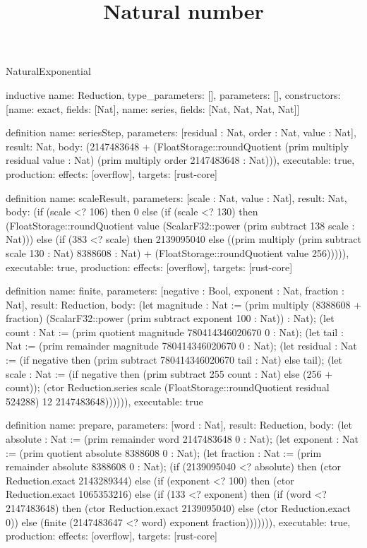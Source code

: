 \begin{lexlean}{NaturalExponential}
\title{Natural number}
\begin{semanticmodule}
inductive{
  name: Reduction,
  type_parameters: [],
  parameters: [],
  constructors: [{name: exact, fields: [Nat]}, {name: series, fields: [Nat, Nat, Nat, Nat]}]
}

definition{
  name: seriesStep,
  parameters: [residual : Nat, order : Nat, value : Nat],
  result: Nat,
  body: (2147483648 + (FloatStorage::roundQuotient (prim multiply residual value : Nat) (prim multiply order 2147483648 : Nat))),
  executable: true,
  production: {effects: [overflow], targets: [rust-core]}
}

definition{
  name: scaleResult,
  parameters: [scale : Nat, value : Nat],
  result: Nat,
  body: (if (scale <? 106) then 0 else (if (scale <? 130) then (FloatStorage::roundQuotient value (ScalarF32::power (prim subtract 138 scale : Nat))) else (if (383 <? scale) then 2139095040 else ((prim multiply (prim subtract scale 130 : Nat) 8388608 : Nat) + (FloatStorage::roundQuotient value 256))))),
  executable: true,
  production: {effects: [overflow], targets: [rust-core]}
}

definition{
  name: finite,
  parameters: [negative : Bool, exponent : Nat, fraction : Nat],
  result: Reduction,
  body: (let magnitude : Nat := (prim multiply (8388608 + fraction) (ScalarF32::power (prim subtract exponent 100 : Nat)) : Nat); (let count : Nat := (prim quotient magnitude 780414346020670 0 : Nat); (let tail : Nat := (prim remainder magnitude 780414346020670 0 : Nat); (let residual : Nat := (if negative then (prim subtract 780414346020670 tail : Nat) else tail); (let scale : Nat := (if negative then (prim subtract 255 count : Nat) else (256 + count)); (ctor Reduction.series scale (FloatStorage::roundQuotient residual 524288) 12 2147483648)))))),
  executable: true
}

definition{
  name: prepare,
  parameters: [word : Nat],
  result: Reduction,
  body: (let absolute : Nat := (prim remainder word 2147483648 0 : Nat); (let exponent : Nat := (prim quotient absolute 8388608 0 : Nat); (let fraction : Nat := (prim remainder absolute 8388608 0 : Nat); (if (2139095040 <? absolute) then (ctor Reduction.exact 2143289344) else (if (exponent <? 100) then (ctor Reduction.exact 1065353216) else (if (133 <? exponent) then (if (word <? 2147483648) then (ctor Reduction.exact 2139095040) else (ctor Reduction.exact 0)) else (finite (2147483647 <? word) exponent fraction))))))),
  executable: true,
  production: {effects: [overflow], targets: [rust-core]}
}


\end{semanticmodule}
\end{lexlean}
